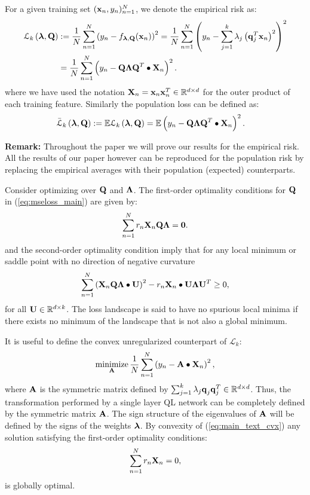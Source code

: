 \documentclass[11pt]{article}
\theoremstyle{plain}
\DeclareMathOperator*{\minimize}{minimize}
\def\R{\mathbb{R}}
\theoremstyle{plain}
\numberwithin{equation}{section}
\numberwithin{lemma}{section}
\numberwithin{theorem}{section}
\numberwithin{corollary}{section}
\numberwithin{observation}{section}
\numberwithin{definition}{section}
\numberwithin{example}{section}
\begin{document}
For a given training set $(\V{x}_n, y_n)_{n=1}^N$, we denote the empirical risk as:
\begin{align*}
\mathcal{L}_k \left( {\V{\lambda}, \Mx{Q}} \right) &:= \frac{1}{N}\sum_{n = 1}^N \left( y_n -  f_{\V{\lambda},\Mx{Q}}({\V{x}_n}) \right)^2 = \frac{1}{N}\sum_{n = 1}^N \left( y_n -  \sum_{j= 1}^k \lambda_j  \left( \V{q}_j^T \V{x}_n\right)^2 \right)^2 \\
&=  \frac{1}{N}\sum_{n = 1}^N \left( y_n -  \Mx{Q \Lambda Q}^T \bullet \Mx{X}_n \right)^2.
\end{align*}
where we have used the notation $\Mx{X}_n = \V{x}_n \V{x}_n^T \in \R^{d \times d}$ for the outer product of each training feature. Similarly the population loss can be defined as:
\begin{align*}
\Bar{\mathcal{L}}_k \left( {\V{\lambda}, \Mx{Q}} \right) &:= \mathbb{E}\mathcal{L}_k \left( {\V{\lambda}, \Mx{Q}} \right) = \mathbb{E} \left( y_n -  \Mx{Q \Lambda Q}^T \bullet \Mx{X}_n \right)^2.
\end{align*}

\textbf{Remark:}  Throughout the paper we will prove our results for the empirical risk. All the results of our paper however can be reproduced for the population risk by replacing the empirical averages with their population (expected) counterparts.

Consider optimizing over $\Mx{Q}$ and $\Mx{\Lambda}$. The first-order optimality conditions for $\Mx{Q}$ in (\ref{eq:mseloss_main}) are given by:
\begin{equation} 
\sum_{n=1}^N r_n \Mx{X}_n \Mx{Q \Lambda} = \Mx{0}.
\end{equation}
and the second-order optimality condition imply that for any local minimum or saddle point with no direction of negative curvature
\begin{equation} 
    \sum_{n=1}^N \left(\Mx{X}_n \Mx{Q \Lambda} \bullet \Mx{U} \right)^2 - r_n\Mx{X}_n \bullet \Mx{U \Lambda U}^T \geq 0,
\end{equation}
for all $\Mx{U} \in \R^{d \times k}$. The loss landscape is said to have no spurious local minima if there exists no minimum of the landscape that is not also a global minimum.

It is useful to define the convex unregularized counterpart of $\mathcal{L}_k$:
\begin{equation} \label{eq:main_text_cvx}
\minimize_{\Mx{A}} \frac{1}{N}\sum_{n=1}^N \left(y_n - \Mx{A} \bullet \Mx{X}_n \right)^2,
\end{equation}
where $\Mx{A}$ is the symmetric matrix defined by $\sum_{j= 1}^k \lambda_j  \V{q}_j \V{q}_j^T \in \R^{d \times d}$. Thus, the transformation performed by a single layer QL network can be completely defined by the symmetric matrix $\Mx{A}$.  The sign structure of the eigenvalues of $\Mx{A}$ will be defined by the signs of the weights $\V{\lambda}$. By convexity of (\ref{eq:main_text_cvx}) any solution satisfying the first-order optimality conditions:
\begin{equation} \label{eq:main_text_KKT_main}
\sum_{n=1}^N r_n \Mx{X}_n = 0,
\end{equation}
is globally optimal. 
\end{document}
